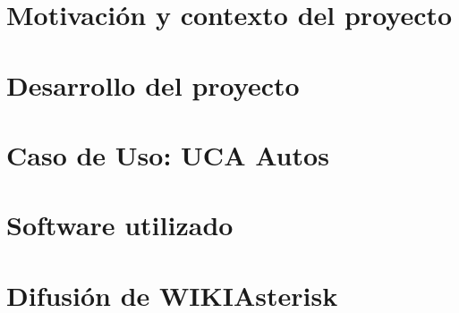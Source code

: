 \documentclass[a4paper,11pt]{book}
\begin{document}
\renewcommand{\listfigurename}{Indice de figuras}
\renewcommand{\tablename}{Tabla}
\renewcommand{\listtablename}{Indice de tablas}


\pagestyle{empty}

\cleardoublepage


\cleardoublepage
\pagestyle{plain}

\frontmatter %


\cleardoublepage

\tableofcontents
\listoffigures
\listoftables

\mainmatter %

\chapter{Motivación y contexto del proyecto}

\chapter{Desarrollo del proyecto}


\chapter{Caso de Uso: UCA Autos}



\backmatter %

\clearpage
{}



\chapter*{Software utilizado}


\chapter*{Difusión de WIKIAsterisk}



\end{document}
